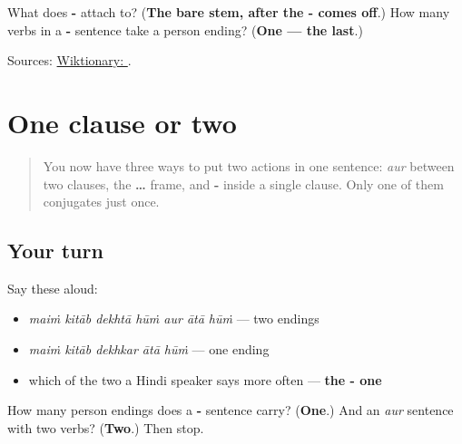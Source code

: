 \begin{tcolorbox}[breakable,colback=teal!4,colframe=teal!35!black,title={Before you move on}]
What does \textbf{-} attach to? (\textbf{The bare stem, after the - comes off}.) How many verbs in a \textbf{-} sentence take a person ending? (\textbf{One — the last}.)

Sources: \href{https://en.wiktionary.org/wiki/\%E0\%A4\%95\%E0\%A4\%B0}{Wiktionary: }.
\end{tcolorbox}
\section[\texorpdfstring{… -\hi{कर} … (… -kar …)}{… -कर … (… -kar …)}]{One clause or two}

\label{lesson:HI-R73-chain}



\begin{quote}
You now have three ways to put two actions in one sentence: \emph{aur} between two clauses, the \textbf{ … } frame, and \textbf{-} inside a single clause. Only one of them conjugates just once.
\end{quote}

\subsection*{Your turn}
Say these aloud:

\begin{itemize}
\raggedright
  \item \emph{maiṁ kitāb dekhtā hūṁ aur ātā hūṁ} — two endings
  \item \emph{maiṁ kitāb dekhkar ātā hūṁ} — one ending
  \item which of the two a Hindi speaker says more often — \textbf{the - one}
\end{itemize}

\begin{tcolorbox}[breakable,colback=teal!4,colframe=teal!35!black,title={Before you move on}]
How many person endings does a \textbf{-} sentence carry? (\textbf{One}.) And an \emph{aur} sentence with two verbs? (\textbf{Two}.) Then stop.
\end{tcolorbox}
